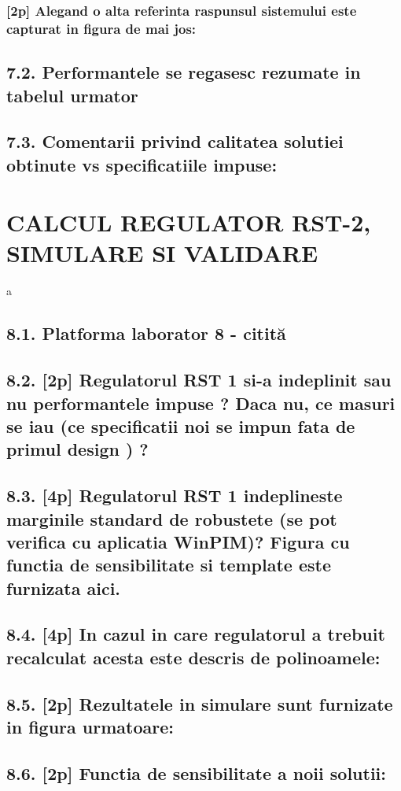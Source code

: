 \documentclass[12pt,english]{article}
\begin{document}
\subsubsection { [2p] Alegand o alta referinta raspunsul sistemului este capturat in figura de mai jos: }
\subsection { 7.2. Performantele se regasesc rezumate in tabelul urmator }
\subsection { 7.3. Comentarii privind calitatea solutiei obtinute vs specificatiile impuse: }

\section { CALCUL REGULATOR RST-2, SIMULARE SI VALIDARE }
a
\subsection { 8.1. Platforma laborator 8 - citită }
\subsection { 8.2. [2p] Regulatorul RST 1 si-a indeplinit sau nu performantele impuse ?  Daca nu, ce masuri se iau (ce specificatii noi se impun fata de primul design ) ? }
\subsection { 8.3. [4p] Regulatorul RST 1 indeplineste marginile standard de robustete (se pot verifica cu aplicatia WinPIM)?   Figura cu functia de sensibilitate si template este furnizata aici. }
\subsection { 8.4. [4p] In cazul in care regulatorul a trebuit recalculat acesta este descris de polinoamele: }
\subsection { 8.5. [2p] Rezultatele in simulare sunt furnizate in figura urmatoare: }
\subsection { 8.6. [2p] Functia de sensibilitate a noii solutii: }
\end{document}
